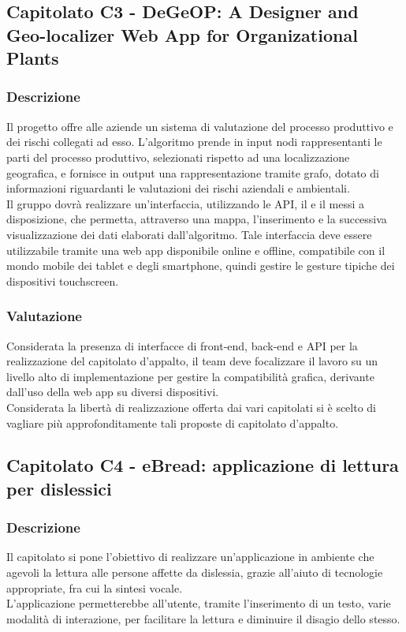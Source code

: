 \subsection{Capitolato C3 -  DeGeOP: A Designer and Geo-localizer Web App for Organizational Plants}
\subsubsection{Descrizione}
Il progetto offre alle aziende un sistema di valutazione del processo produttivo e dei rischi collegati ad esso. L'algoritmo prende in input nodi rappresentanti le parti del processo produttivo, selezionati rispetto ad una localizzazione geografica, e fornisce in output una rappresentazione tramite grafo, dotato di informazioni riguardanti le valutazioni dei rischi aziendali e ambientali.\\
Il gruppo dovrà realizzare un'interfaccia, utilizzando le API, il  e il  messi a disposizione, che permetta, attraverso una mappa, l'inserimento e la successiva visualizzazione dei dati elaborati dall'algoritmo. Tale interfaccia deve essere utilizzabile tramite una web app disponibile online e offline, compatibile con il mondo mobile dei tablet e degli smartphone, quindi gestire le gesture tipiche dei dispositivi touchscreen.

\subsubsection{Valutazione}
Considerata la presenza di interfacce di front-end, back-end e API per la realizzazione del capitolato d'appalto, il team deve focalizzare il lavoro su un livello alto di implementazione per gestire la compatibilità grafica, derivante dall'uso della web app su diversi dispositivi.\\
Considerata la libertà di realizzazione offerta dai vari capitolati si è scelto di vagliare più approfonditamente tali proposte di capitolato d'appalto.

\subsection{Capitolato C4 - eBread: applicazione di lettura per dislessici}
\subsubsection{Descrizione}
Il capitolato si pone l'obiettivo di realizzare un'applicazione in ambiente  che agevoli la lettura alle persone affette da dislessia, grazie all'aiuto di tecnologie appropriate, fra cui la sintesi vocale.\\
L'applicazione permetterebbe all'utente, tramite l'inserimento di un testo, varie modalità di interazione, per facilitare la lettura e diminuire il disagio dello stesso.

